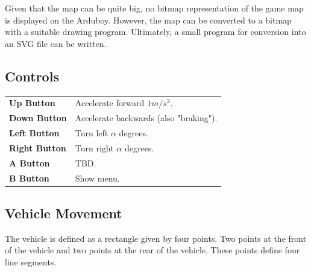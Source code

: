 \documentclass[11pt]{article}
\begin{document}
Given that the map can be quite big, no bitmap representation of the game map
is displayed on the Arduboy. However, the map can be converted to a bitmap
with a suitable drawing program. Ultimately, a small program for conversion
into an SVG file can be written.

\subsection{Controls}
\label{sec-controls}

\begin{tabular}{>{\sffamily\bfseries}ll}
    Up Button & Accelerate forward $1m/s^2$. \\
    Down Button & Accelerate backwards (also "braking").\\
    Left Button & Turn left $\alpha$ degrees.\\
    Right Button & Turn right $\alpha$ degrees.\\
    A Button & TBD.\\
    B Button & Show menu.\\
\end{tabular}

\subsection{Vehicle Movement}
\label{sec-vehicle-movement}

The vehicle is defined as a rectangle given by four points. Two points at the
front of the vehicle and two points at the rear of the vehicle. These points
define four line segments.
\end{document}

